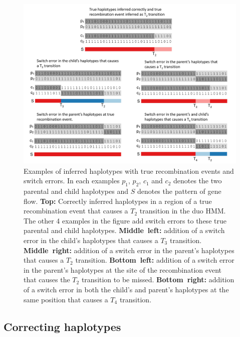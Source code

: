 \begin{figure}[p]
 \begin{center} 
\includegraphics[width=\textwidth]{chap4figs/Fig2}
   \caption[Examples of DuoHMM model]{Examples of inferred haplotypes with true recombination events and switch errors. In each examples $p_1$, $p_2$, $c_1$ and $c_2$ denotes the two parental and child haplotypes and $S$ denotes the pattern of gene flow. \textbf{Top:} Correctly inferred haplotypes in a region of a true  recombination event that causes a $T_2$ transition in the duo HMM. The other 4 examples in the figure add switch errors to these true parental and child haplotypes. \textbf{Middle~left:} addition of a switch error in the child's haplotypes that causes a $T_3$ transition. \textbf{Middle~right:}  addition of a switch error in the parent's haplotypes that causes a $T_2$ transition. \textbf{Bottom~left:} addition of a switch error in the parent's haplotypes at the site of the recombination event that causes the $T_2$ transition to be missed. \textbf{Bottom~right:} addition of a switch error in both the child's and parent's haplotypes at the same position that causes a $T_4$ transition.\label{fig:duo_hmm_examples}}
 \end{center} 
\end{figure}

\subsection{Correcting haplotypes}

